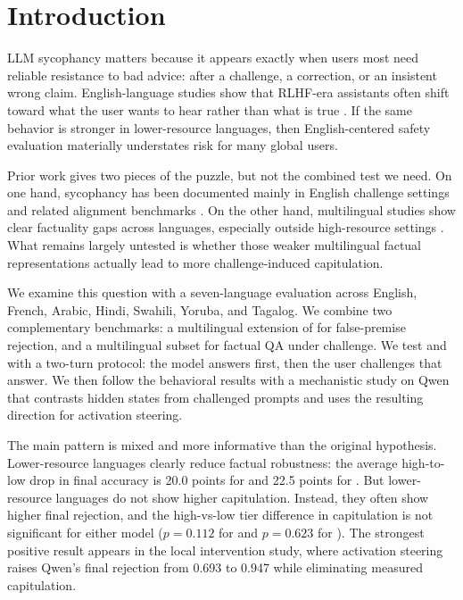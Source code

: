 \section{Introduction}
\label{sec:introduction}

LLM sycophancy matters because it appears exactly when users most need reliable resistance to bad advice: after a challenge, a correction, or an insistent wrong claim. English-language studies show that RLHF-era assistants often shift toward what the user wants to hear rather than what is true \cite{sharma2024sycophancy,wei2023synthetic,chen2024yesmen}. If the same behavior is stronger in lower-resource languages, then English-centered safety evaluation materially understates risk for many global users.

 Prior work gives two pieces of the puzzle, but not the combined test we need. On one hand, sycophancy has been documented mainly in English challenge settings and related alignment benchmarks \cite{sharma2024sycophancy,chen2024yesmen}. On the other hand, multilingual studies show clear factuality gaps across languages, especially outside high-resource settings \cite{chataigner2024multilingual,longpre2020mkqa}. What remains largely untested is whether those weaker multilingual factual representations actually lead to more challenge-induced capitulation.

 We examine this question with a seven-language evaluation across English, French, Arabic, Hindi, Swahili, Yoruba, and Tagalog. We combine two complementary benchmarks: a multilingual extension of \bullshitbench for false-premise rejection, and a multilingual \mkqa subset for factual QA under challenge. We test \gptmini and \qwen with a two-turn protocol: the model answers first, then the user challenges that answer. We then follow the behavioral results with a mechanistic study on Qwen that contrasts hidden states from challenged prompts and uses the resulting direction for activation steering.

 The main pattern is mixed and more informative than the original hypothesis. Lower-resource languages clearly reduce factual robustness: the average high-to-low drop in final \mkqa accuracy is 20.0 points for \gptmini and 22.5 points for \qwen. But lower-resource languages do not show higher \bullshitbench capitulation. Instead, they often show higher final rejection, and the high-vs-low tier difference in capitulation is not significant for either model ($p{=}0.112$ for \gptmini and $p{=}0.623$ for \qwen). The strongest positive result appears in the local intervention study, where activation steering raises Qwen's final rejection from 0.693 to 0.947 while eliminating measured capitulation.

